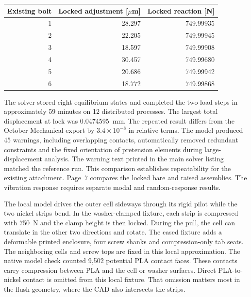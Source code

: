 \begin{center}\begin{tabular}{rrr}\toprule
Existing bolt & Locked adjustment [$\mu$m] & Locked reaction [N]\\\midrule
1 & 28.297 & 749.99935\\
2 & 22.205 & 749.99945\\
3 & 18.597 & 749.99908\\
4 & 30.457 & 749.99680\\
5 & 20.686 & 749.99942\\
6 & 18.772 & 749.99868\\\bottomrule
\end{tabular}
\end{center}

The solver stored eight equilibrium states and completed the two load steps in approximately 59 minutes on 12 distributed processes. The largest total displacement at lock was 0.0474595~mm. The repeated result differs from the October Mechanical export by $3.4\times10^{-8}$ in relative terms. The model produced 45 warnings, including overlapping contacts, automatically removed redundant constraints and the fixed orientation of pretension elements during large-displacement analysis. The warning text printed in the main solver listing matched the reference run. This comparison establishes repeatability for the existing attachment. Page~7 compares the locked bare and raised assemblies. The vibration response requires separate modal and random-response results.

The local model drives the outer cell sideways through its rigid pilot while the two nickel strips bend. In the washer-clamped fixture, each strip is compressed with 750~N and the clamp height is then locked. During the pull, the cell can translate in the other two directions and rotate. The cased fixture adds a deformable printed enclosure, four screw shanks and compression-only tab seats. The neighboring cells and screw tops are fixed in this local approximation. The native model check counted 9,502 potential PLA contact faces. These contacts carry compression between PLA and the cell or washer surfaces. Direct PLA-to-nickel contact is omitted from this local fixture. That omission matters most in the flush geometry, where the CAD also intersects the strips.

